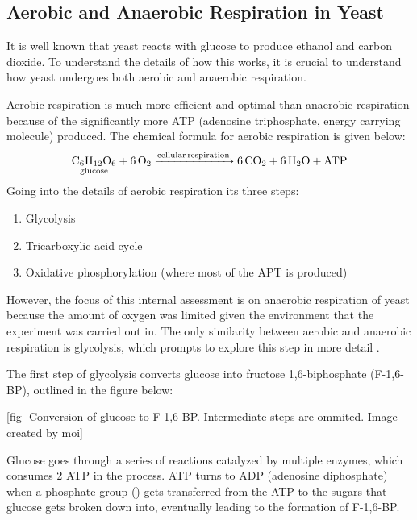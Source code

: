 \documentclass[12pt]{article}
\begin{document}
\subsection{Aerobic and Anaerobic Respiration in Yeast}
It is well known that yeast reacts with glucose to produce ethanol and carbon dioxide. To understand the details of how this works, it is crucial to understand how yeast undergoes both aerobic and anaerobic respiration.

\medskip

Aerobic respiration is much more efficient and optimal than anaerobic respiration because of the significantly more ATP (adenosine triphosphate, energy carrying molecule) produced. The chemical formula for aerobic respiration is given below:
\begin{equation}
    \ce{\underset{\text{glucose}}{\ce{C6H12O6}} + 6O2 ->[cellular respiration] 6CO2 + 6H2O + ATP}
\end{equation}
Going into the details of aerobic respiration its three steps:
\begin{enumerate}[topsep=\parskip, noitemsep]
    \item Glycolysis
    \item Tricarboxylic acid cycle
    \item Oxidative phosphorylation (where most of the APT is produced)
\end{enumerate}


\medskip

However, the focus of this internal assessment is on anaerobic respiration of yeast because the amount of oxygen was limited given the environment that the experiment was carried out in. The only similarity between aerobic and anaerobic respiration is glycolysis, which prompts to explore this step in more detail \parencite{ref}.

\medskip

The first step of glycolysis converts glucose into fructose 1,6-biphosphate (F-1,6-BP), outlined in the figure below:

\medskip

[fig- Conversion of glucose to F-1,6-BP. Intermediate steps are ommited. Image created by moi]

\medskip

Glucose goes through a series of reactions catalyzed by multiple enzymes, which consumes 2 ATP in the process. ATP turns to ADP (adenosine diphosphate) when a phosphate group () gets transferred from the ATP to the sugars that glucose gets broken down into, eventually leading to the formation of F-1,6-BP.
\end{document}
